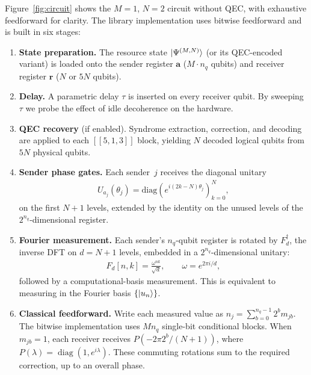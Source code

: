 \documentclass[aps,physrev,10pt,twocolumn,superscriptaddress,floatfix]{revtex4-2}
\begin{document}
Figure~\ref{fig:circuit} shows the $M{=}1$, $N{=}2$ circuit without QEC, with exhaustive feedforward for clarity. The library implementation uses bitwise feedforward and is built in six stages:

\begin{enumerate}
\item \textbf{State preparation.} The resource state $\ket{\Psi^{(M,N)}}$ (or its QEC-encoded variant) is loaded onto the sender register $\mathbf{a}$ ($M\cdot n_q$ qubits) and receiver register $\mathbf{r}$ ($N$ or $5N$ qubits).

\item \textbf{Delay.} A parametric delay $\tau$ is inserted on every receiver qubit. By sweeping $\tau$ we probe the effect of idle decoherence on the hardware.

\item \textbf{QEC recovery} (if enabled). Syndrome extraction, correction, and decoding are applied to each $[[5,1,3]]$ block, yielding $N$ decoded logical qubits from $5N$ physical qubits.

\item \textbf{Sender phase gates.} Each sender~$j$ receives the diagonal unitary
\begin{align}
U_{a_j}(\theta_j) = \mathrm{diag}\!\left(e^{i(2k-N)\theta_j}\right)_{k=0}^{N},
\end{align}
on the first $N+1$ levels, extended by the identity on the unused levels of the $2^{n_q}$-dimensional register.

\item \textbf{Fourier measurement.} Each sender's $n_q$-qubit register is rotated by $F_d^\dagger$, the inverse DFT on $d = N{+}1$ levels, embedded in a $2^{n_q}$-dimensional unitary:
\begin{align}
F_d[n,k] = \frac{\omega^{nk}}{\sqrt{d}},\qquad \omega = e^{2\pi i/d},
\end{align}
followed by a computational-basis measurement. This is equivalent to measuring in the Fourier basis $\{\ket{u_n}\}$.

\item \textbf{Classical feedforward.} Write each measured value as $n_j=\sum_{b=0}^{n_q-1}2^b m_{jb}$. The bitwise implementation uses $Mn_q$ single-bit conditional blocks. When $m_{jb}=1$, each receiver receives $P(-2\pi2^b/(N+1))$, where $P(\lambda)=\operatorname{diag}(1,e^{i\lambda})$. These commuting rotations sum to the required correction, up to an overall phase.

\end{enumerate}
\end{document}
